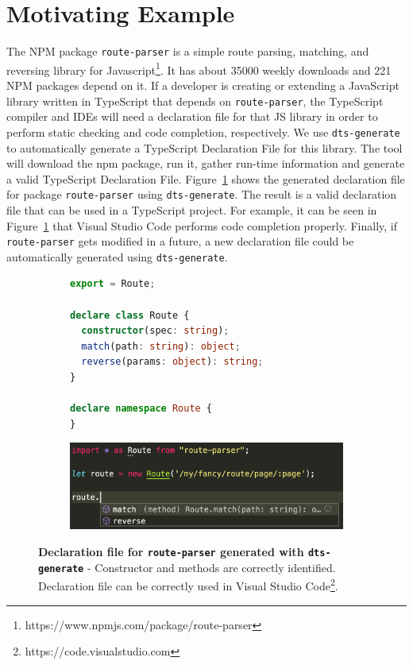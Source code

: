 \documentclass[a4paper,english,cleveref, autoref]{lipics-v2019}
\newcommand{\figref}[1]{Figure~\ref{#1}}
\begin{document}
\section{Motivating Example}
The NPM package \lstinline{route-parser} is a simple route parsing, matching, and reversing library for Javascript\footnote{https://www.npmjs.com/package/route-parser}. It has about 35000 weekly downloads and 221 NPM packages depend on it. If a developer is creating or extending a JavaScript library written in TypeScript that depends on \lstinline{route-parser}, the TypeScript compiler and IDEs will need a declaration file for that JS library in order to perform static checking and code completion, respectively. We use \lstinline{dts-generate} to automatically generate a TypeScript Declaration File for this library. The tool will download the npm package, run it, gather run-time information and generate a valid TypeScript Declaration File. \figref{fig:motivating-example-route-parser-vscode} shows the generated declaration file for package \lstinline{route-parser} using \lstinline{dts-generate}. The result is a valid declaration file that can be used in a TypeScript project. For example, it can be seen in \figref{fig:motivating-example-route-parser-vscode} that Visual Studio Code performs code completion properly. Finally, if \lstinline{route-parser} gets modified in a future, a new declaration file could be automatically generated using \lstinline{dts-generate}.

\begin{figure}[tp]
  \centering
  \begin{subfigure}{0.70\linewidth}
    \begin{lstlisting}[language=TypeScript]
export = Route;

declare class Route {
  constructor(spec: string);
  match(path: string): object;
  reverse(params: object): string;
}

declare namespace Route {
}
    \end{lstlisting}
  \end{subfigure}

  \hspace{10.\textwidth}

  \begin{subfigure}{1.\linewidth}
    \centering
    \includegraphics[width=0.7\linewidth]{motivating-example-route-parser-vscode.png}
  \end{subfigure}

  \caption{\textbf{Declaration file for \lstinline{route-parser} generated with \lstinline{dts-generate}} - Constructor and methods are correctly identified. Declaration file can be correctly used in Visual Studio Code\footnote{https://code.visualstudio.com}.}
  \label{fig:motivating-example-route-parser-vscode}
\end{figure}
\end{document}
